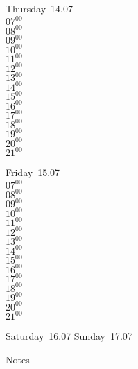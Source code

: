 \documentclass[11pt,a4paper]{book}\usepackage[]{graphicx}\usepackage[]{color}
\begin{document}
\clearpage
\begin{headerbox}
\end{headerbox}
\begin{weekdaybox}
  Thursday~14.07\\
  { 
  \vfill
  $07^{00}$\\
$08^{00}$\\
$09^{00}$\\
$10^{00}$\\
$11^{00}$\\
$12^{00}$\\
$13^{00}$\\
$14^{00}$\\
$15^{00}$\\
$16^{00}$\\
$17^{00}$\\
$18^{00}$\\
$19^{00}$\\
$20^{00}$\\
$21^{00}$\\
  }
\end{weekdaybox} 
\begin{weekdaybox}
  Friday~15.07\\
  { 
  \vfill
  $07^{00}$\\
$08^{00}$\\
$09^{00}$\\
$10^{00}$\\
$11^{00}$\\
$12^{00}$\\
$13^{00}$\\
$14^{00}$\\
$15^{00}$\\
$16^{00}$\\
$17^{00}$\\
$18^{00}$\\
$19^{00}$\\
$20^{00}$\\
$21^{00}$\\
  }
\end{weekdaybox}
\begin{weekendbox}
  Saturday~16.07
  \tcblower
  Sunday~17.07
\end{weekendbox} %
\begin{notebox}
  Notes
\end{notebox}
\clearpage
\end{document}
